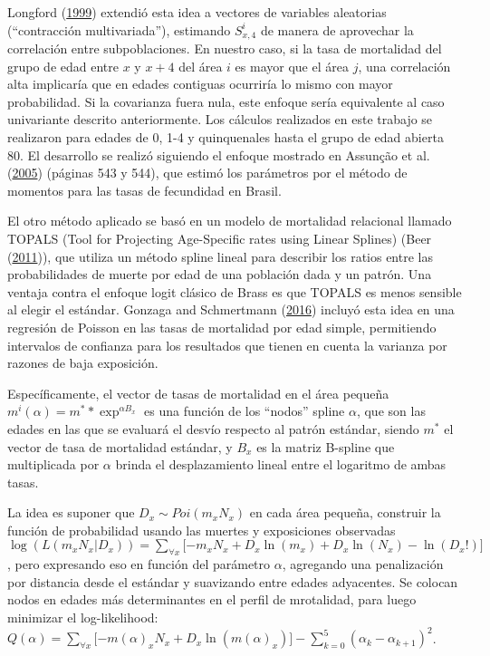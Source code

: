 \documentclass[12pt,]{article}
\begin{document}
Longford (\protect\hyperlink{ref-Longford1999}{1999}) extendió esta idea
a vectores de variables aleatorias (``contracción multivariada''),
estimando \(S_{x,4}^{i}\) de manera de aprovechar la correlación entre
subpoblaciones. En nuestro caso, si la tasa de mortalidad del grupo de
edad entre \(x\) y \(x+4\) del área \(i\) es mayor que el área \(j\),
una correlación alta implicaría que en edades contiguas ocurriría lo
mismo con mayor probabilidad. Si la covarianza fuera nula, este enfoque
sería equivalente al caso univariante descrito anteriormente. Los
cálculos realizados en este trabajo se realizaron para edades de 0, 1-4
y quinquenales hasta el grupo de edad abierta 80. El desarrollo se
realizó siguiendo el enfoque mostrado en Assunção et al.
(\protect\hyperlink{ref-Assuncao2005}{2005}) (páginas 543 y 544), que
estimó los parámetros por el método de momentos para las tasas de
fecundidad en Brasil.

El otro método aplicado se basó en un modelo de mortalidad relacional
llamado TOPALS (Tool for Projecting Age-Specific rates using Linear
Splines) (Beer (\protect\hyperlink{ref-deBeer2011}{2011})), que utiliza
un método spline lineal para describir los ratios entre las
probabilidades de muerte por edad de una población dada y un patrón. Una
ventaja contra el enfoque logit clásico de Brass es que TOPALS es menos
sensible al elegir el estándar. Gonzaga and Schmertmann
(\protect\hyperlink{ref-Gonzaga_Schmertmann_2016}{2016}) incluyó esta
idea en una regresión de Poisson en las tasas de mortalidad por edad
simple, permitiendo intervalos de confianza para los resultados que
tienen en cuenta la varianza por razones de baja exposición.

Específicamente, el vector de tasas de mortalidad en el área pequeña
\(m^{i}(\alpha) = m^{*}*\exp^{\alpha B_{x}}\) es una función de los
``nodos'' spline \(\alpha\), que son las edades en las que se evaluará
el desvío respecto al patrón estándar, siendo \(m^*\) el vector de tasa
de mortalidad estándar, y \(B_{x}\) es la matriz B-spline que
multiplicada por \(\alpha\) brinda el desplazamiento lineal entre el
logaritmo de ambas tasas.

La idea es suponer que \(D_{x}\sim Poi (m_ {x} N_ {x})\) en cada área
pequeña, construir la función de probabilidad usando las muertes y
exposiciones observadas
\(\log(L(m_{x}N_{x}|D_{x}))=\sum_{\forall x}{\lbrack -m_{x}N_{x}+D_{x}\ln (m_{x})+D_{x}\ln (N_{x})-\ln (D_{x}!)\rbrack}\),
pero expresando eso en función del parámetro \(\alpha\), agregando una
penalización por distancia desde el estándar y suavizando entre edades
adyacentes. Se colocan nodos en edades más determinantes en el perfil de
mrotalidad, para luego minimizar el log-likelihood:
\(Q(\alpha )=\sum_{\forall x}{\lbrack -m(\alpha )_{x}N_{x}+D_{x}\ln(m(\alpha )_{x})\rbrack }-\sum_{k=0}^{5}{(\alpha _{k}-\alpha _{k+1})^{2}}\).
\end{document}
